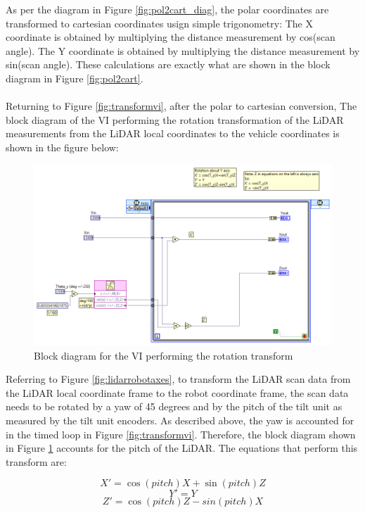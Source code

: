 \noindent As per the diagram in Figure \ref{fig:pol2cart_diag}, the polar coordinates are transformed to cartesian coordinates usign simple trigonometry: The X coordinate is obtained by multiplying the distance measurement by cos(scan angle). The Y coordinate is obtained by multiplying the distance measurement by sin(scan angle). These calculations are exactly what are shown in the block diagram in Figure \ref{fig:pol2cart}.\\ \\
%
Returning to Figure \ref{fig:transformvi}, after the polar to cartesian conversion,
%
The block diagram of the VI performing the rotation transformation of the LiDAR measurements from the LiDAR local coordinates to the vehicle coordinates is shown in the figure below:

\newpage

\begin{figure}[h!]
\centering
\includegraphics[scale=0.6]{Photos/rotationblock.png}
\caption{Block diagram for the VI performing the rotation transform}
\label{fig:rotationblock}
\end{figure}

\noindent Referring to Figure \ref{fig:lidarrobotaxes}, to transform the LiDAR scan data from the LiDAR local coordinate frame to the robot coordinate frame, the scan data needs to be rotated by a yaw of 45 degrees and by the pitch of the tilt unit as measured by the tilt unit encoders. As described above, the yaw is accounted for in the timed loop in Figure \ref{fig:transformvi}. Therefore, the block diagram shown in Figure \ref{fig:rotationblock} accounts for the pitch of the LiDAR. The equations that perform this transform are:

\begin{equation}
X'=\cos(pitch)X + \sin(pitch)Z
\label{eq:Xrot}
\end{equation}
\begin{equation}
Y'=Y
\label{eq:Yrot}
\end{equation}
\begin{equation}
Z'=\cos(pitch)Z - sin(pitch)X
\label{eq:Zrot}
\end{equation}

